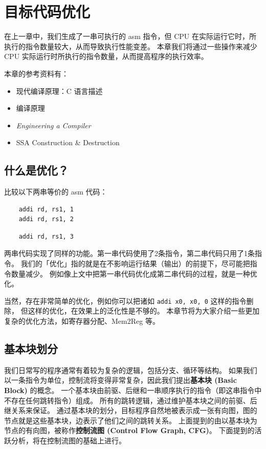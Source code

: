 \chapter{目标代码优化}

\label{chap:optimize}
在上一章中，我们生成了一串可执行的 asm 指令，但 CPU 在实际运行它时，所执行的指令数量较大，从而导致执行性能变差。
本章我们将通过一些操作来减少 CPU 实际运行时所执行的指令数量，从而提高程序的执行效率。

\begin{remark}
本章的参考资料有：
\begin{itemize}
    \item 现代编译原理：C 语言描述\cite{TigerBook}
    \item 编译原理\cite{DragonBook}
    \item \textit{Engineering a Compiler}\cite{EngineeringACompiler}
    \item SSA Construction \& Destruction\cite{SSAConstructionAndDestruction}
\end{itemize}
\end{remark}

\section{什么是优化？}

比较以下两串等价的 asm 代码：
\begin{lstlisting}
    addi rd, rs1, 1
    addi rd, rs1, 2
\end{lstlisting}
\begin{lstlisting}  
    addi rd, rs1, 3
\end{lstlisting}

两串代码实现了同样的功能。第一串代码使用了2条指令，第二串代码只用了1条指令。
我们的「优化」指的就是在不影响运行结果（输出）的前提下，尽可能把指令数量减少。
例如像上文中把第一串代码优化成第二串代码的过程，就是一种优化。

当然，存在非常简单的优化，例如你可以把诸如 \texttt{addi x0, x0, 0} 这样的指令删除，
但这样的优化，在效果上的泛化性是不够的。
本章节将为大家介绍一些更加复杂的优化方法，如寄存器分配、Mem2Reg 等。

\section{基本块划分}

我们日常写的程序通常有着较为复杂的逻辑，包括分支、循环等结构。
如果我们以一条指令为单位，控制流将变得非常复杂，因此我们提出\textbf{基本块 (Basic Block)} 的概念。
一个基本块由前驱、后继和一串顺序执行的指令（即这串指令中不存在任何跳转指令）组成。
所有的跳转逻辑，通过维护基本块之间的前驱、后继关系来保证。
通过基本块的划分，目标程序自然地被表示成一张有向图，图的节点就是这些基本块，边表示了他们之间的跳转关系。
上面提到的由以基本块为节点的有向图，被称作\textbf{控制流图 (Control Flow Graph, CFG)}。
下面提到的活跃分析，将在控制流图的基础上进行。


